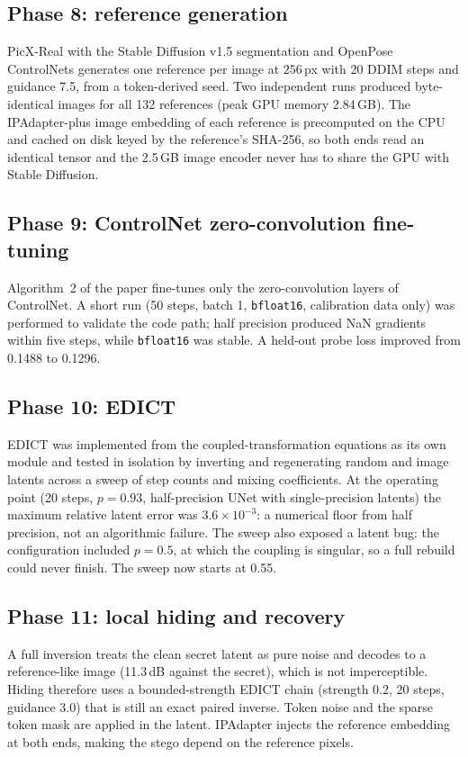 \subsection{Phase 8: reference generation}
PicX-Real with the Stable Diffusion v1.5 segmentation and OpenPose ControlNets generates one
reference per image at $256$\,px with 20 DDIM steps and guidance 7.5, from a token-derived seed.
Two independent runs produced byte-identical images for all 132 references (peak GPU memory
2.84\,GB). The IPAdapter-plus image embedding of each reference is precomputed on the CPU and
cached on disk keyed by the reference's SHA-256, so both ends read an identical tensor and the
2.5\,GB image encoder never has to share the GPU with Stable Diffusion.


\subsection{Phase 9: ControlNet zero-convolution fine-tuning}
Algorithm~2 of the paper fine-tunes only the zero-convolution layers of ControlNet. A short run
(50 steps, batch 1, \texttt{bfloat16}, calibration data only) was performed to validate the code
path; half precision produced NaN gradients within five steps, while \texttt{bfloat16} was stable.
A held-out probe loss improved from 0.1488 to 0.1296.

\subsection{Phase 10: EDICT}
EDICT was implemented from the coupled-transformation equations as its own module and tested in
isolation by inverting and regenerating random and image latents across a sweep of step counts
and mixing coefficients. At the operating point (20 steps, $p=0.93$,
half-precision UNet with single-precision latents) the maximum relative latent error was
$3.6\times10^{-3}$: a numerical floor from half precision, not an algorithmic failure. The sweep
also exposed a latent bug: the configuration included $p=0.5$, at which the coupling is
singular, so a full rebuild could never finish. The sweep now starts at 0.55.

\subsection{Phase 11: local hiding and recovery}
A full inversion treats the clean secret latent as pure noise and decodes to a reference-like
image (11.3\,dB against the secret), which is not imperceptible. Hiding therefore uses a
bounded-strength EDICT chain (strength 0.2, 20 steps, guidance 3.0) that is still an exact
paired inverse. Token noise and the sparse token mask are applied in the latent. IPAdapter
injects the reference embedding at both ends, making the stego depend on the reference pixels.

